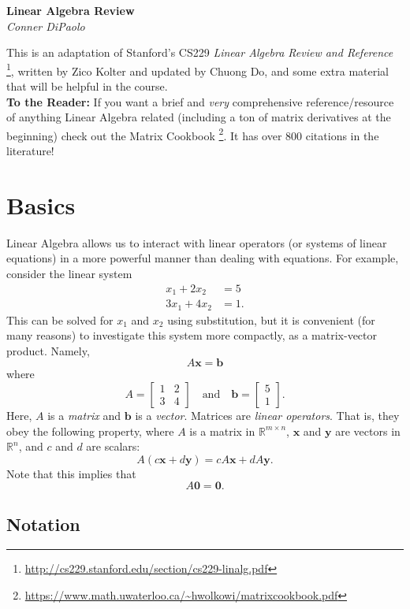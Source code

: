 \documentclass{article}
\newcommand{\1}{\mathbf{1}}
\newcommand{\0}{\mathbf{0}}
\newcommand{\xx}{\mathbf{x}}
\newcommand{\yy}{\mathbf{y}}
\newcommand{\bb}{\mathbf{b}}
\newcommand{\RR}{\mathbb{R}}
\newcommand{\m}[1]{\begin{bmatrix} #1 \end{bmatrix}}
\begin{document}
\begin{center}
  \Large\textbf{Linear Algebra Review}\\
  \large\textit{Conner DiPaolo}
\end{center}
\vspace*{1em}

\tableofcontents
\vspace{1em}

This is an adaptation of Stanford's CS229 \textit{Linear Algebra Review and Reference}
\footnote{\url{http://cs229.stanford.edu/section/cs229-linalg.pdf}}, written by Zico Kolter
and updated by Chuong Do, and some extra material that will be helpful in the
course.\\

\textbf{To the Reader:} If you want a brief and \textit{very} comprehensive reference/resource
of anything Linear Algebra related (including a ton of matrix derivatives at the beginning)
check out the Matrix Cookbook \footnote{\url{https://www.math.uwaterloo.ca/~hwolkowi/matrixcookbook.pdf}}.
It has over 800 citations in the literature!

\section{Basics}

Linear Algebra allows us to interact with linear operators (or systems
of linear equations) in a more powerful manner than dealing with equations.
For example, consider the linear system
\begin{align*}
    x_1 + 2x_2 &= 5\\
    3x_1 + 4x_2 &= 1.
\end{align*}
This can be solved for $x_1$ and $x_2$ using substitution, but it is
convenient (for many reasons) to investigate this system more compactly,
as a matrix-vector product. Namely,
\[
    A\xx = \bb
\]
where
\[
    A = \m{1&2\\3&4} \quad\text{and}\quad \bb = \m{5\\1}.
\]
Here, $A$ is a \textit{matrix} and $\bb$ is a \textit{vector}. Matrices are
\textit{linear operators}. That is, they obey the following property, where
$A$ is a matrix in $\RR^{m\times n}$, $\xx$ and $\yy$ are vectors in $\RR^n$,
and $c$ and $d$ are scalars:
\[
    A(c\xx+d\yy) = cA\xx + dA\yy.
\]
Note that this implies that
\[
    A\0 = \0.
\]

\subsection{Notation}
\end{document}
